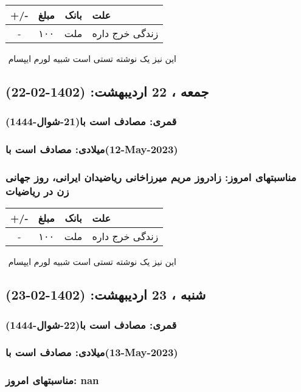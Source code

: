 \documentclass{article}
\newcommand{\rnote}[1]{\marginpar{\textcolor{color}{\StrSubstitute{\##1}{ }{\_}}}}
\newcommand{\myRow}[4]{
    #1 & #2 & #3 & #4 \\ \hline
}
\begin{document}
\begin{tabular}{ | c | c | c | p{5cm} |}
    \hline
    \myRow{ +/- }{مبلغ}{بانک}{علت}
    \myRow{-}{۱۰۰}{ملت}{زندگی خرج داره}
\end{tabular}
\newline
\newline

‌
\rnote{تست}
این نیز یک نوشته تستی است شبیه لورم ایپسام




\newpage
{}
\textcolor{color}{
\section{ جمعه ، 22 اردیبهشت: (1402-02-22) }
\subsubsection*{قمری: مصادف است با(21-شوال-1444)} 
\subsubsection*{میلادی: مصادف است با(12-May-2023)}
\subsubsection*{مناسبتهای امروز: زادروز مریم میرزاخانی ریاضیدان ایرانی، روز جهانی زن در ریاضیات}
}


\begin{tabular}{ | c | c | c | p{5cm} |}
    \hline
    \myRow{ +/- }{مبلغ}{بانک}{علت}
    \myRow{-}{۱۰۰}{ملت}{زندگی خرج داره}
\end{tabular}
\newline
\newline

‌
\rnote{تست}
این نیز یک نوشته تستی است شبیه لورم ایپسام




\newpage
{}
\textcolor{color}{
\section{ شنبه ، 23 اردیبهشت: (1402-02-23) }
\subsubsection*{قمری: مصادف است با(22-شوال-1444)} 
\subsubsection*{میلادی: مصادف است با(13-May-2023)}
\subsubsection*{مناسبتهای امروز: nan}
}
\end{document}
